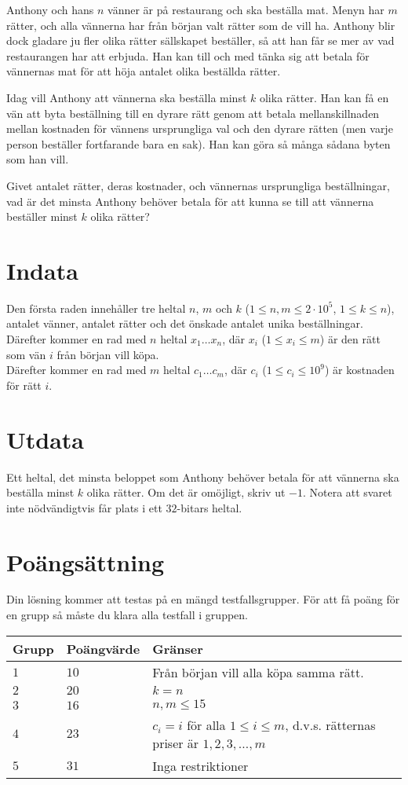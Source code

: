 Anthony och hans $n$ vänner är på restaurang och ska beställa mat. Menyn har $m$ rätter, och alla vännerna har från början valt rätter som de vill ha. Anthony blir dock gladare ju fler olika rätter sällskapet beställer, så att han får se mer av vad restaurangen har att erbjuda. Han kan till och med tänka sig att betala för vännernas mat för att höja antalet olika beställda rätter.

Idag vill Anthony att vännerna ska beställa minst $k$ olika rätter. Han kan få en vän att byta beställning till en dyrare rätt genom att betala mellanskillnaden mellan kostnaden för vännens ursprungliga val och den dyrare rätten (men varje person beställer fortfarande bara en sak). Han kan göra så många sådana byten som han vill.

Givet antalet rätter, deras kostnader, och vännernas ursprungliga beställningar, vad är det minsta Anthony behöver betala för att kunna se till att vännerna beställer minst $k$ olika rätter?

\section*{Indata}
Den första raden innehåller tre heltal $n$, $m$ och $k$ ($1 \leq n, m \leq 2 \cdot 10^5$, $1 \le k \le n$), antalet vänner, antalet rätter och det önskade antalet unika beställningar. \\
Därefter kommer en rad med $n$ heltal $x_1 \dots x_n$, där $x_i$ ($1 \leq x_i \leq m$) är den rätt som vän $i$ från början vill köpa. \\
Därefter kommer en rad med $m$ heltal $c_1 \dots c_m$, där $c_i$ ($1 \leq c_i \leq 10^9$) är kostnaden för rätt $i$.

\section*{Utdata}
Ett heltal, det minsta beloppet som Anthony behöver betala för att vännerna ska beställa minst $k$ olika rätter. Om det är omöjligt, skriv ut $-1$. Notera att svaret inte nödvändigtvis får plats i ett $32$-bitars heltal.

\section*{Poängsättning}
Din lösning kommer att testas på en mängd testfallsgrupper.
För att få poäng för en grupp så måste du klara alla testfall i gruppen.

\noindent
\begin{tabular}{| l | l | l |}
\hline
Grupp & Poängvärde & Gränser \\ \hline
$1$    & $10$         & Från början vill alla köpa samma rätt. \\ \hline
$2$    & $20$         & $k = n$ \\ \hline
$3$    & $16$         & $n, m \le 15$ \\ \hline
$4$    & $23$         & $c_i = i$ för alla $1 \leq i \leq m$, d.v.s. rätternas priser är $1, 2, 3, \dots, m$ \\ \hline
$5$    & $31$         & Inga restriktioner \\ \hline
\end{tabular}

